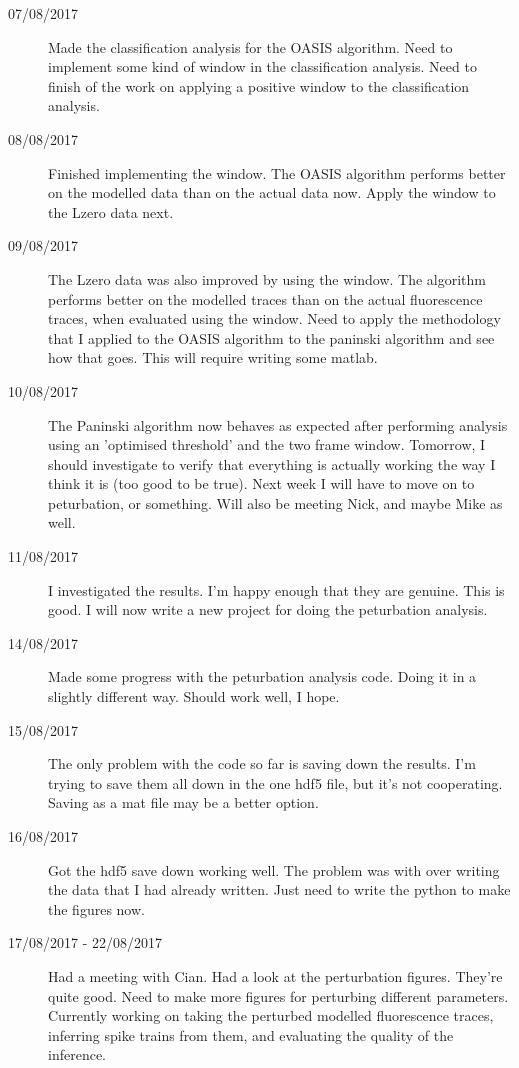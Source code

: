 \documentclass[a4paper,12pt]{article}
\theoremstyle{definition}
\begin{document}
\begin{description}
	\item[07/08/2017] Made the classification analysis for the OASIS algorithm. Need to implement some kind of window in the classification analysis. Need to finish of the work on applying a positive window to the classification analysis.

	\item[08/08/2017] Finished implementing the window. The OASIS algorithm performs better on the modelled data than on the actual data now. Apply the window to the Lzero data next.

	\item[09/08/2017] The Lzero data was also improved by using the window. The algorithm performs better on the modelled traces than on the actual fluorescence traces, when evaluated using the window. Need to apply the methodology that I applied to the OASIS algorithm to the paninski algorithm and see how that goes. This will require writing some matlab.

	\item[10/08/2017] The Paninski algorithm now behaves as expected after performing analysis using an 'optimised threshold' and the two frame window. Tomorrow, I should investigate to verify that everything is actually working the way I think it is (too good to be true). Next week I will have to move on to peturbation, or something. Will also be meeting Nick, and maybe Mike as well.

	\item[11/08/2017] I investigated the results. I'm happy enough that they are genuine. This is good. I will now write a new project for doing the peturbation analysis.

	\item[14/08/2017] Made some progress with the peturbation analysis code. Doing it in a slightly different way. Should work well, I hope.

	\item[15/08/2017] The only problem with the code so far is saving down the results. I'm trying to save them all down in the one hdf5 file, but it's not cooperating. Saving as a mat file may be a better option.

	\item[16/08/2017] Got the hdf5 save down working well. The problem was with over writing the data that I had already written. Just need to write the python to make the figures now.

	\item[17/08/2017 - 22/08/2017] Had a meeting with Cian. Had a look at the perturbation figures. They're quite good. Need to make more figures for perturbing different parameters. Currently working on taking the perturbed modelled fluorescence traces, inferring spike trains from them, and evaluating the quality of the inference.


\end{description}
\end{document}
